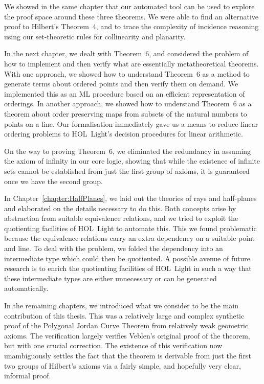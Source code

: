 We showed in the same chapter that our automated tool can be used to explore the proof space around these three theorems. We were able to find an alternative proof to Hilbert's Theorem~4, and to trace the complexity of incidence reasoning using our set-theoretic rules for collinearity and planarity.

In the next chapter, we dealt with Theorem~6, and considered the problem of how to implement and then verify what are essentially metatheoretical theorems. With one approach, we showed how to understand Theorem~6 as a method to generate terms about ordered points and then verify them on demand. We implemented this as an ML procedure based on an efficient representation of orderings. In another approach, we showed how to understand Theorem~6 as a theorem about order preserving maps from subsets of the natural numbers to points on a line. Our formalisation immediately gave us a means to reduce linear ordering problems to HOL~Light's decision procedures for linear arithmetic.

On the way to proving Theorem~6, we eliminated the redundancy in assuming the axiom of infinity in our core logic, showing that while the existence of infinite sets cannot be established from just the first group of axioms, it is guaranteed once we have the second group. 

In Chapter~\ref{chapter:HalfPlanes}, we laid out the theories of rays and half-planes and elaborated on the details necessary to do this. Both concepts arise by abstraction from suitable equivalence relations, and we tried to exploit the quotienting facilities of HOL~Light to automate this. This we found problematic because the equivalence relations carry an extra dependency on a suitable point and line. To deal with the problem, we folded the dependency into an intermediate type which could then be quotiented. A possible avenue of future research is to enrich the quotienting facilities of HOL~Light in such a way that these intermediate types are either unnecessary or can be generated automatically.

In the remaining chapters, we introduced what we consider to be the main contribution of this thesis. This was a relatively large and complex synthetic proof of the Polygonal Jordan Curve Theorem from relatively weak geometric axioms. The verification largely verifies Veblen's original proof of the theorem, but with one crucial correction. The existence of this verification now unambiguously settles the fact that the theorem is derivable from just the first two groups of Hilbert's axioms via a fairly simple, and hopefully very clear, informal proof.


